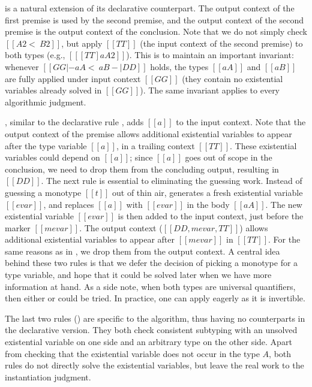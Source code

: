  is a natural extension of its declarative counterpart. The
output context of the first premise is used by the second premise, and the
output context of the second premise is the output context of the conclusion.
Note that we do not simply check $[[ A2 <~ B2 ]]$, but apply $[[TT]]$ (the input
context of the second premise) to both types (e.g., $[[ [TT]aA2 ]]$). This is to
maintain an important invariant: whenever $[[ GG |- aA <~ aB -| DD ]]$ holds, the types $[[aA]]$ and $[[aB]]$ are fully applied under input context
$[[GG]]$ (they contain no existential variables already solved in $[[GG]]$). The
same invariant applies to every algorithmic judgment.


, similar to the declarative rule , adds $[[a]]$ to the input context.
Note that the output context of the premise allows additional existential variables to appear
after the type variable $[[a]]$, in a trailing context $[[TT]]$. These existential variables
could depend on $[[a]]$; since $[[a]]$
goes out of scope in the conclusion, we need to drop them from
the concluding output, resulting in $[[DD]]$.
The next rule is essential to eliminating the guessing work. Instead of
guessing a monotype $[[t]]$ out of thin air,  generates a fresh
existential variable $[[evar]]$, and replaces $[[a]]$ with $[[evar]]$ in the
body $[[aA]]$. The new existential variable $[[evar]]$ is then added to the input context,
just before the
marker $[[mevar]]$. The output context ($[[ DD, mevar, TT   ]]$) allows additional existential variables to
appear after $[[mevar]]$ in $[[TT]]$.
For the same reasons as in , we drop them from the output context.
A central idea behind these two rules is that we defer the decision of picking a
monotype for a type variable, and hope that it could be solved later when we
have more information at hand. As a side note, when both types are universal quantifiers,
then either  or  could be tried.
In practice, one can apply  eagerly as it is invertible.


The last two rules () are specific to the algorithm,
thus having no counterparts in the declarative version. They both check
consistent subtyping with an unsolved existential variable on one side and an
arbitrary type on the other side. Apart from checking that the existential
variable does not occur in the type $A$, both rules do not directly solve the
existential variables, but leave the real work to the instantiation judgment.

